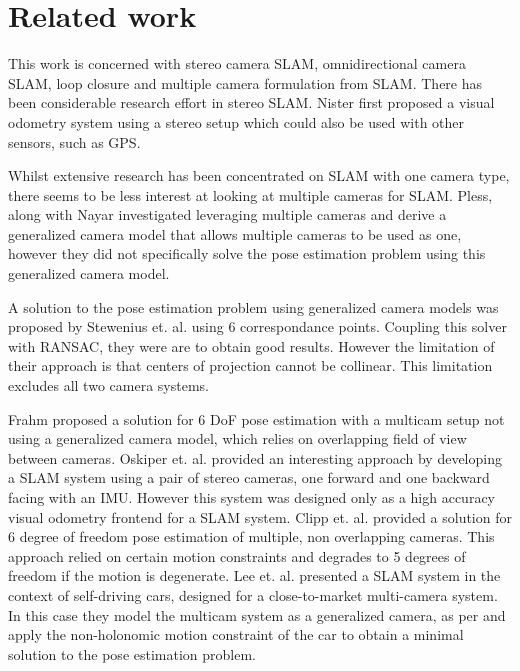 \section{Related work}

This work is concerned with stereo camera SLAM, omnidirectional camera SLAM, loop closure and multiple camera formulation from SLAM.  There has been considerable research effort in stereo SLAM. Nister \cite{nister_04} first proposed a visual odometry system using a stereo setup which could also be used with other sensors, such as GPS.


Whilst extensive research has been concentrated on SLAM with one camera type, there seems to be less interest at looking at multiple cameras for SLAM.  Pless\cite{pless_03}, along with Nayar\cite{nayar_01} investigated leveraging multiple cameras and derive a generalized camera model that allows multiple cameras to be used as one, however they did not specifically solve the pose estimation problem using this generalized camera model.  

A solution to the pose estimation problem using generalized camera models was proposed by Stewenius et. al. \cite{stewenius_05} using 6 correspondance points.  Coupling this solver with RANSAC, they were are to obtain good results.  However the limitation of their approach is that centers of projection cannot be collinear. This limitation excludes all two camera systems.

Frahm\cite{frahm_04} proposed a solution for 6 DoF pose estimation with a multicam setup not using a generalized camera model, which relies on overlapping field of view between cameras. Oskiper et. al.\cite{oskiper_07} provided an interesting approach by developing a SLAM system using a pair of stereo cameras, one forward and one backward facing with an IMU.  However this system was designed only as a high accuracy visual odometry frontend for a SLAM system.  Clipp et. al.\cite{clipp_09} provided a solution for 6 degree of freedom pose estimation of multiple, non overlapping cameras.  This approach relied on certain motion constraints and degrades to 5 degrees of freedom if the motion is degenerate.  Lee et. al.\cite{lee_13} presented a SLAM system in the context of self-driving cars, designed for a close-to-market multi-camera system.  In this case they model the multicam system as a generalized camera, as per \cite{pless_03} and apply the non-holonomic motion constraint of the car to obtain a minimal solution to the pose estimation problem.
